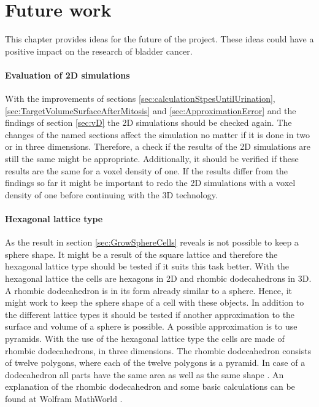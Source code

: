 \chapter{Future work}
This chapter provides ideas for the future of the project. These ideas could have a positive impact on the research of bladder cancer.

\subsubsection{Evaluation of 2D simulations}
With the improvements of sections \ref{sec:calculationStpesUntilUrination}, \ref{sec:TargetVolumeSurfaceAfterMitosis} and \ref{sec:ApproximationError} and the findings of section \ref{sec:vD} the 2D simulations should be checked again. The changes of the named sections affect the simulation no matter if it is done in two or in three dimensions. Therefore, a check if the results of the 2D simulations are still the same might be appropriate. Additionally, it should be verified if these results are the same for a voxel density of one. If the results differ from the findings so far it might be important to redo the 2D simulations with a voxel density of one before continuing with the 3D technology.

\subsubsection{Hexagonal lattice type}
As the result in section \ref{sec:GrowSphereCells} reveals is not possible to keep a sphere shape. It might be a result of the square lattice and therefore the hexagonal lattice type should be tested if it suits this task better. With the hexagonal lattice the cells are hexagons in 2D and rhombic dodecahedrons in 3D. A rhombic dodecahedron is in its form already similar to a sphere. Hence, it might work to keep the sphere shape of a cell with these objects. \newline
In addition to the different lattice types it should be tested if another approximation to the surface and volume of a sphere is possible. A possible approximation is to use pyramids. With the use of the hexagonal lattice type the cells are made of rhombic dodecahedrons, in three dimensions. The rhombic dodecahedron consists of twelve polygons, where each of the twelve polygons is a pyramid. In case of a dodecahedron all parts have the same area as well as the same shape \cite{Horn1984}. An explanation of the rhombic dodecahedron and some basic calculations can be found at Wolfram MathWorld \cite{RhombicDodecahedron.html}.

